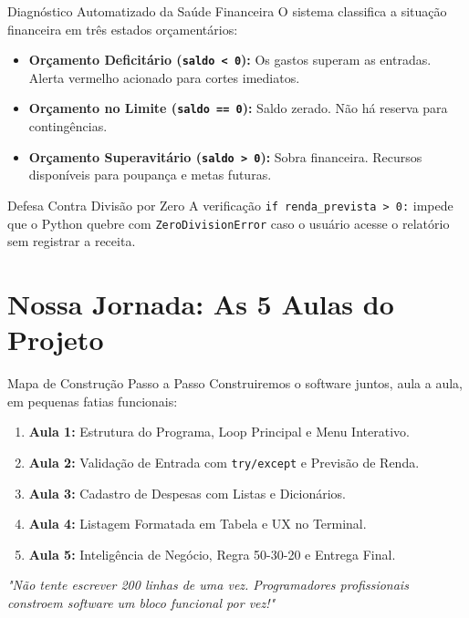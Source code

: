 \documentclass[10pt]{beamer}
\begin{document}
\begin{frame}{Diagnóstico Automatizado da Saúde Financeira}
    O sistema classifica a situação financeira em três estados orçamentários:

    \vspace{0.3cm}
    \begin{itemize}
        \item \textbf{Orçamento Deficitário (\texttt{saldo < 0}):}
        Os gastos superam as entradas. Alerta vermelho acionado para cortes imediatos.
        \item \textbf{Orçamento no Limite (\texttt{saldo == 0}):}
        Saldo zerado. Não há reserva para contingências.
        \item \textbf{Orçamento Superavitário (\texttt{saldo > 0}):}
        Sobra financeira. Recursos disponíveis para poupança e metas futuras.
    \end{itemize}

    \vspace{0.3cm}
    \begin{block}{Defesa Contra Divisão por Zero}
        A verificação \texttt{if renda\_prevista > 0:} impede que o Python quebre com \texttt{ZeroDivisionError} caso o usuário acesse o relatório sem registrar a receita.
    \end{block}
\end{frame}

\section{Nossa Jornada: As 5 Aulas do Projeto}

\begin{frame}{Mapa de Construção Passo a Passo}
    Construiremos o software juntos, aula a aula, em pequenas fatias funcionais:

    \vspace{0.3cm}
    \begin{enumerate}
        \item \textbf{Aula 1:} Estrutura do Programa, Loop Principal e Menu Interativo.
        \item \textbf{Aula 2:} Validação de Entrada com \texttt{try/except} e Previsão de Renda.
        \item \textbf{Aula 3:} Cadastro de Despesas com Listas e Dicionários.
        \item \textbf{Aula 4:} Listagem Formatada em Tabela e UX no Terminal.
        \item \textbf{Aula 5:} Inteligência de Negócio, Regra 50-30-20 e Entrega Final.
    \end{enumerate}

    \vspace{0.3cm}
    \begin{center}
        \textit{"Não tente escrever 200 linhas de uma vez. Programadores profissionais constroem software um bloco funcional por vez!"}
    \end{center}
\end{frame}
\end{document}
